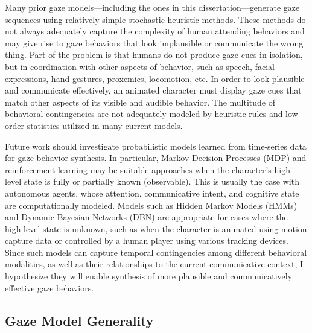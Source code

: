 Many prior gaze models---including the ones in this dissertation---generate gaze sequences using relatively simple stochastic-heuristic methods. These methods do not always adequately capture the complexity of human attending behaviors and may give rise to gaze behaviors that look implausible or communicate the wrong thing. Part of the problem is that humans do not produce gaze cues in isolation, but in coordination with other aspects of behavior, such as speech, facial expressions, hand gestures, proxemics, locomotion, etc. In order to look plausible and communicate effectively, an animated character must display gaze cues that match other aspects of its visible and audible behavior. The multitude of behavioral contingencies are not adequately modeled by heuristic rules and low-order statistics utilized in many current models.

Future work should investigate probabilistic models learned from time-series data for gaze behavior synthesis. In particular, Markov Decision Processes (MDP) and reinforcement learning may be suitable approaches when the character's high-level state is fully or partially known (observable). This is usually the case with autonomous agents, whose attention, communicative intent, and cognitive state are computationally modeled. Models such as Hidden Markov Models (HMMs) and Dynamic Bayesian Networks (DBN) are appropriate for cases where the high-level state is unknown, such as when the character is animated using motion capture data or controlled by a human player using various tracking devices. Since such models can capture temporal contingencies among different behavioral modalities, as well as their relationships to the current communicative context, I hypothesize they will enable synthesis of more plausible and communicatively effective gaze behaviors.

\subsection{Gaze Model Generality}

